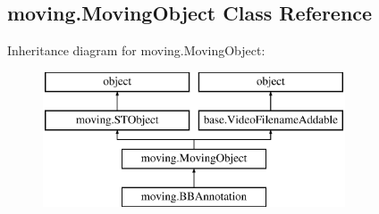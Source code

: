 \hypertarget{classmoving_1_1MovingObject}{\subsection{moving.\-Moving\-Object Class Reference}
\label{classmoving_1_1MovingObject}
}
Inheritance diagram for moving.\-Moving\-Object\-:\begin{figure}[H]
\begin{center}
\leavevmode
\includegraphics[height=4.000000cm]{classmoving_1_1MovingObject}
\end{center}
\end{figure}
